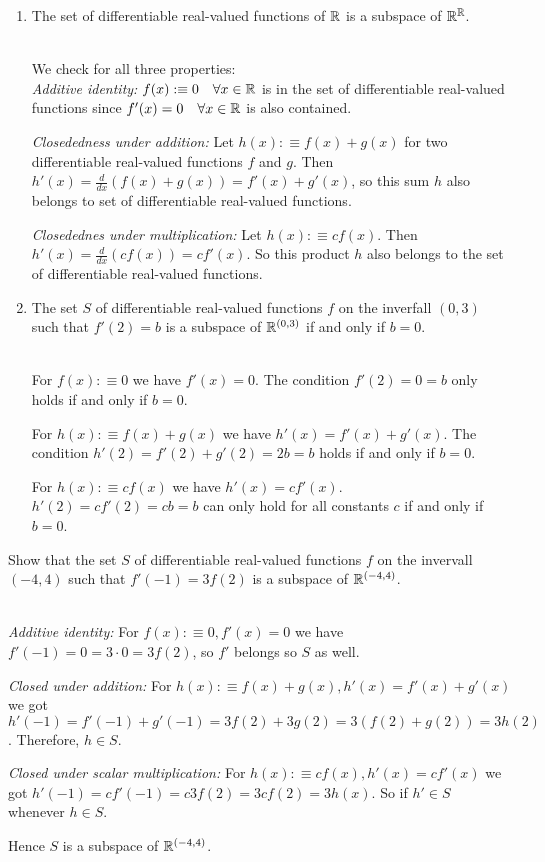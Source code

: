 \begin{xrcs}
\begin{enumerate}
    \item{
      The set of differentiable real-valued functions of $\mathbb{R}$ is a subspace of $\mathbb{R}^{\mathbb{R}}$.

       \\
      We check for all three properties: \\
      \emph{Additive identity:} $f(x) :\equiv 0 \quad \forall x \in \mathbb{R}$ is in the set of differentiable real-valued functions since $f'(x) = 0 \quad \forall x \in \mathbb{R}$ is also contained.

      \emph{Closededness under addition:} Let $h(x) :\equiv f(x) + g(x)$ for two differentiable real-valued functions $f$ and $g$. Then $h'(x) = \frac{d}{dx} (f(x)+g(x)) = f'(x) + g'(x)$, so this sum $h$ also belongs to set of differentiable real-valued functions.

      \emph{Closedednes under multiplication:} Let $h(x) :\equiv c f(x)$. Then $h'(x) = \frac{d}{dx} (c f(x)) = c f'(x)$. So this product $h$ also belongs to the set of differentiable real-valued functions.
    }

    \item{
      The set $S$ of differentiable real-valued functions $f$ on the inverfall $(0,3)$ such that $f'(2) = b$ is a subspace of $\mathbb{R}^{(0,3)}$ if and only if $b=0$.

       \\
      For $f(x) :\equiv 0$ we have $f'(x) = 0$. The condition $f'(2) =  0 = b$ only holds if and only if $b=0$.

      For $h(x) :\equiv f(x) + g(x)$ we have $h'(x) = f'(x) + g'(x)$. The condition $h'(2) = f'(2) + g'(2) = 2b = b$  holds if and only if $b=0$.

      For $h(x) :\equiv cf(x)$ we have $h'(x) = cf'(x)$. $h'(2) = cf'(2) = cb = b$ can only hold for all constants $c$ if and only if $b=0$.
    }
  \end{enumerate}
\end{xrcs}


\begin{xrcs}
  Show that the set $S$ of differentiable real-valued functions $f$ on the invervall $(-4,4)$ such that $f'(-1) = 3f(2)$ is a subspace of $\mathbb{R}^{(-4,4)}$.

   \\
  \emph{Additive identity:} For $f(x) :\equiv 0, f'(x) = 0$ we have $f'(-1) = 0 = 3 \cdot 0 = 3f(2)$, so $f'$ belongs so $S$ as well.

  \emph{Closed under addition:} For $h(x) :\equiv f(x) + g(x), h'(x) = f'(x) + g'(x)$ we got $h'(-1) = f'(-1) + g'(-1) = 3f(2) + 3g(2) = 3(f(2)+g(2)) = 3h(2)$. Therefore, $h \in S$.

  \emph{Closed under scalar multiplication:} For $h(x) :\equiv cf(x), h'(x) = cf'(x)$ we got $h'(-1) = cf'(-1) = c3f(2) = 3cf(2) = 3h(x)$. So if $h' \in S$ whenever $h \in S$.

  Hence $S$ is a subspace of $\mathbb{R}^{(-4,4)}$.
\end{xrcs}

